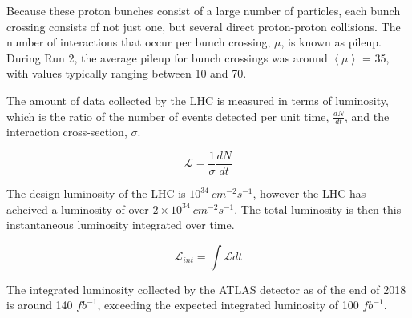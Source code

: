 Because these proton bunches consist of a large number of particles, each bunch crossing consists of not just one, but several direct proton-proton collisions. The number of interactions that occur per bunch crossing, $\mu$, is known as pileup. During Run 2, the average pileup for bunch crossings was around $\left\langle\mu\right\rangle$ = 35, with values typically ranging between 10 and 70.

The amount of data collected by the LHC is measured in terms of luminosity, which is the ratio of the number of events detected per unit time, $\frac{dN}{dt}$, and the interaction cross-section, $\sigma$. 

\begin{equation}                                                                                                                                
        \label{eq:lumiDef}                                                                                                                      
        \mathcal{L} = \frac{1}{\sigma}\frac{dN}{dt}
\end{equation}

The design luminosity of the LHC is $10^{34}\ cm^{-2}s^{-1}$, however the LHC has acheived a luminosity of over $2\times 10^{34}\ cm^{-2}s^{-1}$. The total luminosity is then this instantaneous luminosity integrated over time.

\begin{equation}
        \label{eq:intLumi}      
        \mathcal{L}_{int} = \int\mathcal{L}dt
\end{equation}

The integrated luminosity collected by the ATLAS detector as of the end of 2018 is around 140 $fb^{-1}$, exceeding the expected integrated luminosity of 100 $fb^{-1}$.
                                            
                                         
